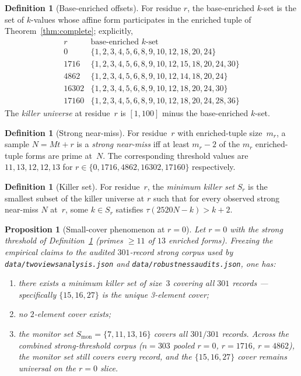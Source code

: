 \documentclass[11pt]{article}
\renewcommand{\_}{\origunderscore\allowbreak}
\newtheorem{proposition}[theorem]{Proposition}
\theoremstyle{definition}
\newtheorem{definition}[theorem]{Definition}
\theoremstyle{remark}
\begin{document}
\begin{definition}[Base-enriched offsets]\label{def:baseenriched}
For residue $r$, the base-enriched $k$-set is the set of $k$-values
whose affine form participates in the enriched tuple of
Theorem~\ref{thm:complete}; explicitly,
\[
  \begin{array}{l|l}
    r & \text{base-enriched } k\text{-set}\\ \hline
    0    & \{1,2,3,4,5,6,8,9,10,12,18,20,24\}\\
    1716 & \{1,2,3,4,5,6,8,9,10,12,15,18,20,24,30\}\\
    4862 & \{1,2,3,4,5,6,8,9,10,12,14,18,20,24\}\\
    16302 & \{1,2,3,4,5,6,8,9,10,12,18,20,24,30\}\\
    17160 & \{1,2,3,4,5,6,8,9,10,12,18,20,24,28,36\}
  \end{array}
\]
The \emph{killer universe} at residue~$r$ is $[1,100]$ minus the
base-enriched $k$-set.
\end{definition}

\begin{definition}[Strong near-miss]\label{def:strong_near_miss}
For residue~$r$ with enriched-tuple size~$m_r$, a sample $N=Mt+r$
is a \emph{strong near-miss} iff at least $m_r-2$ of the $m_r$
enriched-tuple forms are prime at~$N$. The corresponding threshold
values are $11,13,12,12,13$ for
$r\in\{0,1716,4862,16302,17160\}$ respectively.
\end{definition}

\begin{definition}[Killer set]\label{def:killer_set}
For residue~$r$, the \emph{minimum killer set} $S_r$ is the smallest
subset of the killer universe at $r$ such that for every observed
strong near-miss $N$ at~$r$, some $k\in S_r$ satisfies
$\tau(2520N-k)>k+2$.
\end{definition}

\begin{proposition}[Small-cover phenomenon at $r=0$]\label{prop:killer_sets}
Let $r=0$ with the strong threshold of
Definition~\ref{def:strong_near_miss} (primes $\ge 11$ of $13$
enriched forms). Freezing the empirical claims to the audited
$301$-record strong corpus used by
\texttt{data/two\_views\_analysis.json} and
\texttt{data/robustness\_audits.json}, one has:
\begin{enumerate}
\item there exists a minimum killer set of size~$3$ covering
all $301$ records — specifically $\{15,16,27\}$ is the unique
3-element cover;
\item no $2$-element cover exists;
\item the monitor set
$S_{\mathrm{mon}}=\{7,11,13,16\}$ covers all $301/301$ records.
Across the combined strong-threshold corpus
($n=303$ pooled $r=0$, $r=1716$, $r=4862$), the monitor set
still covers every record, and the $\{15,16,27\}$ cover remains
universal on the $r=0$ slice.
\end{enumerate}
\end{proposition}
\end{document}
